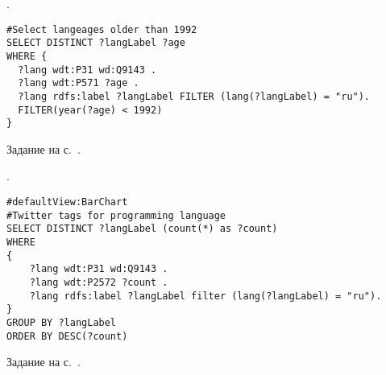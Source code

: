\newpage
\begin{task}
    \label{answer:prog_langs_5}
    . 
	\begin{lstlisting}[language=SPARQL, caption={{\href{https://w.wiki/v4f}{Языки программирования, старше 1992 года}}\protect\footnotemark}, label=lst:prog_lang_answer_5]
#Select langeages older than 1992
SELECT DISTINCT ?langLabel ?age
WHERE {
  ?lang wdt:P31 wd:Q9143 .
  ?lang wdt:P571 ?age .
  ?lang rdfs:label ?langLabel FILTER (lang(?langLabel) = "ru").
  FILTER(year(?age) < 1992)
}
\end{lstlisting}
    
\small{Задание на с.~\pageref{prog_lang_test}.}
\end{task}

\begin{task}
    \label{answer:prog_langs_6}
    . 
	\begin{lstlisting}[language=SPARQL, caption={{\href{https://w.wiki/v4h}{Хештеги языков программирования в Твиттере}}\protect\footnotemark}, label=lst:prog_lang_answer_6]
#defaultView:BarChart
#Twitter tags for programming language
SELECT DISTINCT ?langLabel (count(*) as ?count)
WHERE
{
    ?lang wdt:P31 wd:Q9143 .
    ?lang wdt:P2572 ?count .
    ?lang rdfs:label ?langLabel filter (lang(?langLabel) = "ru"). 
} 
GROUP BY ?langLabel
ORDER BY DESC(?count)
\end{lstlisting}
    
\small{Задание на с.~\pageref{prog_lang_test}.}
\end{task}





\newpage
\hfil{}\hfil%

